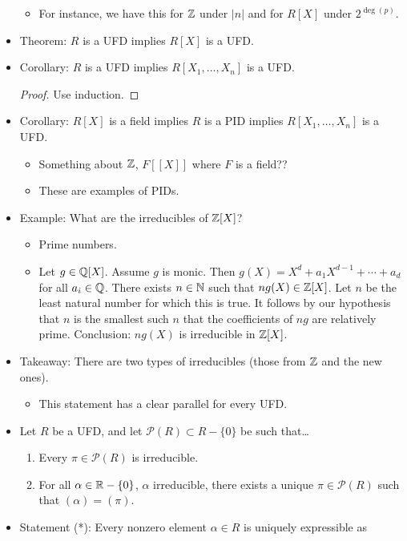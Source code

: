 \documentclass[../notes.tex]{subfiles}
\begin{document}
\begin{itemize}
\begin{itemize}
        \item For instance, we have this for $\mathbb{Z}$ under $|n|$ and for $R[X]$ under $2^{\deg(p)}$.
    \end{itemize}
    \item Theorem: $R$ is a UFD implies $R[X]$ is a UFD.
    \item Corollary: $R$ is a UFD implies $R[X_1,\dots,X_n]$ is a UFD.
    \begin{proof}
        Use induction.
    \end{proof}
    \item Corollary: $R[X]$ is a field implies $R$ is a PID implies $R[X_1,\dots,X_n]$ is a UFD.
    \begin{itemize}
        \item Something about $\mathbb{Z}$, $F[[X]]$ where $F$ is a field??
        \item These are examples of PIDs.
    \end{itemize}
    \item Example: What are the irreducibles of $\mathbb{Z}[X]$?
    \begin{itemize}
        \item Prime numbers.
        \item Let $g\in\mathbb{Q}[X]$. Assume $g$ is monic. Then $g(X)=X^d+a_1X^{d-1}+\cdots+a_d$ for all $a_i\in\mathbb{Q}$. There exists $n\in\mathbb{N}$ such that $ng(X)\in\mathbb{Z}[X]$. Let $n$ be the least natural number for which this is true. It follows by our hypothesis that $n$ is the smallest such $n$ that the coefficients of $ng$ are relatively prime. Conclusion: $ng(X)$ is irreducible in $\mathbb{Z}[X]$.
    \end{itemize}
    \item Takeaway: There are two types of irreducibles (those from $\mathbb{Z}$ and the new ones).
    \begin{itemize}
        \item This statement has a clear parallel for every UFD.
    \end{itemize}
    \item Let $R$ be a UFD, and let $\mathcal{P}(R)\subset R-\{0\}$ be such that\dots
    \begin{enumerate}[label={(\roman*)}]
        \item Every $\pi\in\mathcal{P}(R)$ is irreducible.
        \item For all $\alpha\in\mathbb{R}-\{0\}$, $\alpha$ irreducible, there exists a unique $\pi\in\mathcal{P}(R)$ such that $(\alpha)=(\pi)$.
    \end{enumerate}
    \item Statement (*): Every nonzero element $\alpha\in R$ is uniquely expressible as

\end{itemize}
\end{document}
